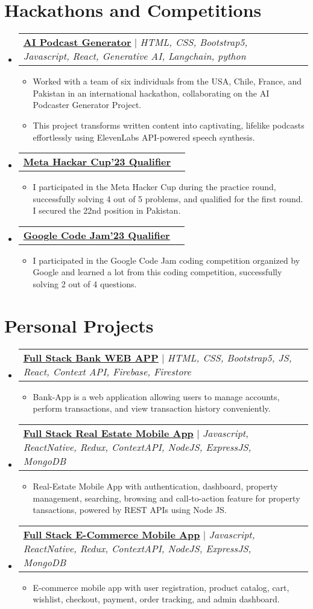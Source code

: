 \documentclass[letterpaper,11pt]{article}
\makeatletter
\newcommand{\resumeItem}[1]{
  \item\small{
    {#1 \vspace{-2pt}}
  }
}
\newcommand{\resumeProjectHeading}[2]{
    \item
    \begin{tabular*}{0.97\textwidth}{l@{\extracolsep{\fill}}r}
      \small#1 & #2 \\
    \end{tabular*}\vspace{-7pt}
}
\newcommand{\resumeSubHeadingListStart}{\begin{itemize}[leftmargin=0.15in, label={}]}
\newcommand{\resumeSubHeadingListEnd}{\end{itemize}}
\newcommand{\resumeItemListStart}{\begin{itemize}}
\newcommand{\resumeItemListEnd}{\end{itemize}\vspace{-5pt}}
\makeatother
\begin{document}
\section{Hackathons and Competitions}
\resumeSubHeadingListStart
\resumeProjectHeading
{\textbf{\href{https://github.com/Louvivien/AIpodcastgenerator}{\underline{AI Podcast Generator}}} $|$ \emph{HTML, CSS, Bootstrap5, Javascript, React, Generative AI, Langchain, python}}{}
\resumeItemListStart
\resumeItem{Worked with a team of six individuals from the USA, Chile, France, and Pakistan in an international hackathon, collaborating on the AI Podcaster Generator Project.}
\resumeItem{This project transforms written content into captivating, lifelike podcasts effortlessly using ElevenLabs API-powered speech synthesis.}
\resumeItemListEnd
\resumeProjectHeading
{\textbf{\href{https://shorturl.at/kHNZ2}{\underline{Meta Hackar Cup'23 Qualifier}}}}{}
\resumeItemListStart
\resumeItem{I participated in the Meta Hacker Cup during the practice round, successfully solving 4 out of 5 problems, and qualified for the first round. I secured the 22nd position in Pakistan.}
\resumeItemListEnd
\resumeProjectHeading
{\textbf{\href{https://shorturl.at/myRTX}{\underline{Google Code Jam'23 Qualifier}}}}{}
\resumeItemListStart
\resumeItem{I participated in the Google Code Jam coding competition organized by Google and learned a lot from this coding competition, successfully solving 2 out of 4 questions.}
\resumeItemListEnd
\resumeSubHeadingListEnd
%


\section{Personal Projects}
\resumeSubHeadingListStart
\resumeProjectHeading
{\textbf{\href{https://github.com/Ahmadjajja/React_Bank}{\underline{Full Stack Bank WEB APP}}} $|$ \emph{HTML, CSS, Bootstrap5, JS, React, Context API, Firebase, Firestore}}{}
\resumeItemListStart
\resumeItem{Bank-App is a web application allowing users to manage accounts, perform
  transactions, and view transaction history conveniently.}
\resumeItemListEnd
\resumeProjectHeading
{\textbf{\href{https://github.com/Ahmadjajja/Social_Real_Estate_System_Mobile_App_Frontend}{\underline{Full Stack Real Estate Mobile App}}} $|$ \emph{Javascript, ReactNative, Redux, ContextAPI, NodeJS,
    ExpressJS, MongoDB}}{}
\resumeItemListStart
\resumeItem{Real-Estate Mobile App with authentication, dashboard, property
  management, searching, browsing and call-to-action feature for property
  tansactions, powered by REST APIs using Node JS.}
\resumeItemListEnd
\resumeProjectHeading
{\textbf{\href{https://github.com/Ahmadjajja/E_Commerce_Mobile_App_Frontend}{\underline{Full Stack E-Commerce Mobile App}}} $|$ \emph{Javascript, ReactNative, Redux, ContextAPI, NodeJS,
    ExpressJS, MongoDB}}{}
\resumeItemListStart
\resumeItem{E-commerce mobile app with user registration, product catalog, cart, wishlist,
  checkout, payment, order tracking, and admin dashboard.}
\resumeItemListEnd
\resumeSubHeadingListEnd
%
\end{document}
